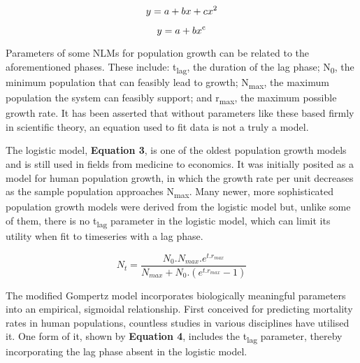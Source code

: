 \documentclass[11pt]{article}
\begin{document}
\begin{equation}
    y = a + bx + cx\textsuperscript{2}
\end{equation}

\begin{equation}
    y = a + bx\textsuperscript{c}
\end{equation}
\vspace{2mm}

Parameters of some NLMs for population growth can be related to the aforementioned phases. These include: t\textsubscript{lag}, the duration of the lag phase; N\textsubscript{0}, the minimum population that can feasibly lead to growth; N\textsubscript{max}, the maximum population the system can feasibly support; and r\textsubscript{max}, the maximum possible growth rate.\parencite{Micha2011} It has been asserted that without parameters like these based firmly in scientific theory, an equation used to fit data is not a truly a model.\parencite{Buchanan1997}

  

The logistic model, \textbf{Equation 3}, is one of the oldest population growth models and is still used in fields from medicine to economics. It was initially posited as a model for human population growth, in which the growth rate per unit decreases as the sample population approaches N\textsubscript{max}.\parencite{Peleg1997} Many newer, more sophisticated population growth models were derived from the logistic model but, unlike some of them, there is no t\textsubscript{lag} parameter in the logistic model, which can limit its utility when fit to timeseries with a lag phase.

\begin{equation}
    N_{t} = \frac{ N_{0} . N_{max} . e^{t . r_{max}}      }
                 { N_{max} + N_{0} . (e^{t . r_{max}} - 1)}
\end{equation}
\vspace{3mm}



The modified Gompertz model incorporates biologically meaningful parameters into an empirical, sigmoidal relationship.\parencite{Tjørve2017, Buchanan1997} First conceived for predicting mortality rates in human populations, countless studies in various disciplines have utilised it.\parencite{Tjørve2017, Buchanan1997, Mokhtari2019, Peleg1997} One form of it, shown by \textbf{Equation 4}, includes the t\textsubscript{lag} parameter, thereby incorporating the lag phase absent in the logistic model.\parencite{Zwietering1990,Buchanan1997}
\end{document}

